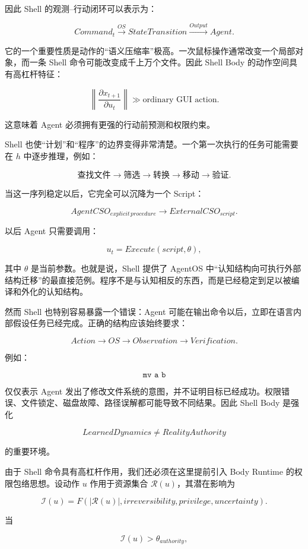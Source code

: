 因此 Shell 的观测--行动闭环可以表示为：

$$
Command_t
\xrightarrow{OS}
StateTransition
\xrightarrow{Output}
Agent.
$$

它的一个重要性质是动作的“语义压缩率”极高。一次鼠标操作通常改变一个局部对象，而一条 Shell 命令可能改变成千上万个文件。因此 Shell Body 的动作空间具有高杠杆特征：

$$
\left\|
\frac{\partial x_{t+1}}
{\partial u_t}
\right\|
\gg
\text{ordinary GUI action}.
$$

这意味着 Agent 必须拥有更强的行动前预测和权限约束。

Shell 也使“计划”和“程序”的边界变得非常清楚。一个第一次执行的任务可能需要在 $h$ 中逐步推理，例如：

$$
\text{查找文件}
\rightarrow
\text{筛选}
\rightarrow
\text{转换}
\rightarrow
\text{移动}
\rightarrow
\text{验证}.
$$

当这一序列稳定以后，它完全可以沉降为一个 Script：

$$
AgentCSO_{explicit\,procedure}
\rightarrow
ExternalCSO_{script}.
$$

以后 Agent 只需要调用：

$$
u_t=Execute(script,\theta),
$$

其中 $\theta$ 是当前参数。也就是说，Shell 提供了 AgentOS 中“认知结构向可执行外部结构迁移”的最直接范例。程序不是与认知相反的东西，而是已经稳定到足以被编译和外化的认知结构。

然而 Shell 也特别容易暴露一个错误：Agent 可能在输出命令以后，立即在语言内部假设任务已经完成。正确的结构应该始终要求：

$$
Action
\rightarrow
OS
\rightarrow
Observation
\rightarrow
Verification.
$$

例如：

$$
\texttt{mv a b}
$$

仅仅表示 Agent 发出了修改文件系统的意图，并不证明目标已经成功。权限错误、文件锁定、磁盘故障、路径误解都可能导致不同结果。因此 Shell Body 是强化

$$
\boxed{
LearnedDynamics\neq RealityAuthority
}
$$

的重要环境。

由于 Shell 命令具有高杠杆作用，我们还必须在这里提前引入 Body Runtime 的权限包络思想。设动作 $u$ 作用于资源集合 $\mathcal R(u)$，其潜在影响为

$$
\mathcal I(u)
=
F(
|\mathcal R(u)|,
irreversibility,
privilege,
uncertainty
).
$$

当

$$
\mathcal I(u)>\theta_{authority},
$$


